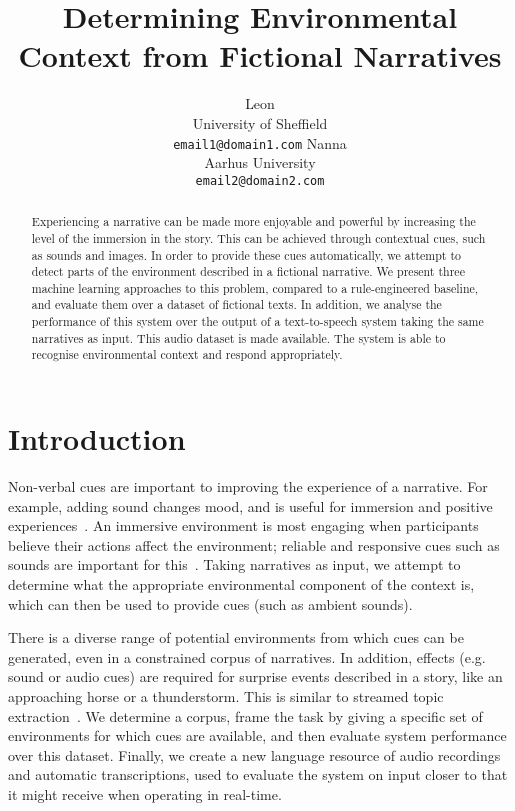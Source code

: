\documentclass[11pt]{article}
\title{Determining Environmental Context from Fictional Narratives}
\author{Leon\\
  University of Sheffield\\
  {\tt email1@domain1.com}  \And
  Nanna\\
  Aarhus University\\
  {\tt  email2@domain2.com}}
\date{}
\begin{document}
\maketitle
\begin{abstract}
Experiencing a narrative can be made more enjoyable and powerful by increasing the level of the immersion in the story.
This can be achieved through contextual cues, such as sounds and images.
In order to provide these cues automatically, we attempt to detect parts of the environment described in a fictional narrative.
We present three machine learning approaches to this problem, compared to a rule-engineered baseline, and evaluate them over a dataset of fictional texts.
In addition, we analyse the performance of this system over the output of a text-to-speech system taking the same narratives as input.
This audio dataset is made available.
The system is able to recognise environmental context and respond appropriately.
\end{abstract}


\section{Introduction}

Non-verbal cues are important to improving the experience of a narrative. 
For example, adding sound changes mood, and is useful for immersion and positive experiences~\cite{madden2009collaborative,huiberts2010captivating}.
An immersive environment is most engaging when participants believe their actions affect the environment; reliable and responsive cues such as sounds are important for this~\cite{bobick1999kidsroom}. 
Taking narratives as input, we attempt to determine what the appropriate environmental component of the context is, which can then be used to provide cues (such as ambient sounds).

There is a diverse range of potential environments from which cues can be generated, even in a constrained corpus of narratives.
In addition, effects (e.g. sound or audio cues) are required for surprise events described in a story, like an approaching horse or a thunderstorm.
This is similar to streamed topic extraction~\cite{allan2002introduction,preotiuc2012trendminer}.
We determine a corpus, frame the task by giving a specific set of environments for which cues are available, and then evaluate system performance over this dataset.
Finally, we create a new language resource of audio recordings and automatic transcriptions, used to evaluate the system on input closer to that it might receive when operating in real-time.
\end{document}
